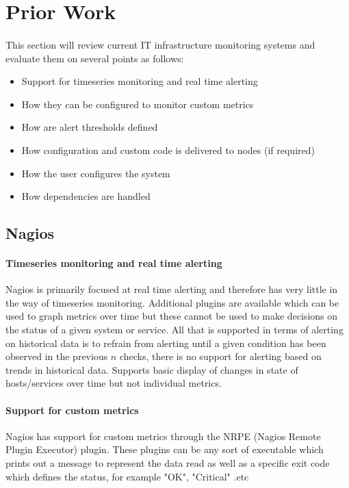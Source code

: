 \documentclass[bsc,logo,twoside]{infthesis}
\begin{document}
\section{Prior Work}
\paragraph*{}
This section will review current IT infrastructure monitoring systems and
evaluate them on several points as follows:
\begin{itemize}
	\item Support for timeseries monitoring and real time alerting
	\item How they can be configured to monitor custom metrics
	\item How are alert thresholds defined
	\item How configuration and custom code is delivered to nodes (if required)
	\item How the user configures the system
	\item How dependencies are handled
\end{itemize}

\subsection{Nagios}
\paragraph*{Timeseries monitoring and real time alerting}
Nagios is primarily focused at real time alerting and therefore has very little
in the way of timeseries monitoring.  Additional plugins are available which can
be used to graph metrics over time but these cannot be used to make decisions on
the status of a given system or service. All that is supported in terms of
alerting on historical data is to refrain from alerting until a given condition
has been observed in the previous $n$ checks, there is no support for alerting
based on trends in historical data.  Supports basic display of changes in state
of hosts/services over time but not individual metrics.

\paragraph*{Support for custom metrics}
Nagios has support for custom metrics through the NRPE (Nagios Remote Plugin
Executor) plugin. These plugins can be any sort of executable which prints out a
message to represent the data read as well as a specific exit code which defines
the status, for example "OK", "Critical" .etc
\end{document}
